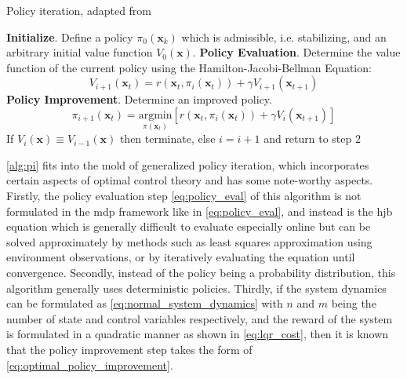 \documentclass[../report.tex]{subfiles}
\begin{document}
\begin{algorithm}[H]
	\caption{Policy iteration, adapted from \cite{pi_and_vi_algorithm}} \label{alg:pi}
	\begin{algorithmic}[1]
        \State \textbf{Initialize}. Define a policy $\pi_0(\mathbf{x}_k)$ which is admissible, i.e. stabilizing, and an arbitrary initial value function $V_0(\mathbf{x})$.
        \State \textbf{Policy Evaluation}. Determine the value function of the current policy using the Hamilton-Jacobi-Bellman Equation:
        \begin{equation}\label{eq:adp_poli_eval}
            V_{i+1}(\mathbf{x}_t) = r(\mathbf{x}_t, \pi_i(\mathbf{x}_t)) + \gamma V_{i+1}(\mathbf{x}_{t+1})
        \end{equation}
        \State \textbf{Policy Improvement}. Determine an improved policy. 
        {\myfont
        \begin{equation}\label{eq:adp_poli_improv}
            \pi_{i+1}(\mathbf{x}_t) = \underset{\pi(\mathbf{x}_t)}{\text{argmin}}[r(\mathbf{x}_t, \pi_i(\mathbf{x}_t)) + \gamma V_i(\mathbf{x}_{t+1})]
        \end{equation}}
        \State If $V_i(\mathbf{x}) \equiv V_{i-1}(\mathbf{x})$ then terminate, else $i = i+1$ and return to step $2$
	\end{algorithmic} 
\end{algorithm}

\autoref{alg:pi} fits into the mold of generalized policy iteration, which incorporates certain aspects of optimal control theory and has some note-worthy aspects. Firstly, the policy evaluation step \autoref{eq:policy_eval} of this algorithm is not formulated in the \ac{mdp} framework like in \autoref{eq:policy_eval}, and instead is the \ac{hjb} equation which is generally difficult to evaluate especially online\cite{frank_lewis_hjb} but can be solved approximately by methods such as least squares approximation using environment observations\cite{ls_approximation}, or by iteratively evaluating the equation until convergence\cite{pi_and_vi_algorithm}. Secondly, instead of the policy being a probability distribution, this algorithm generally uses deterministic policies. Thirdly, if the system dynamics can be formulated as \autoref{eq:normal_system_dynamics} with $n$ and $m$ being the number of state and control variables respectively, and the reward of the system is formulated in a quadratic manner as shown in \autoref{eq:lqr_cost}, then it is known that the policy improvement step takes the form of \autoref{eq:optimal_policy_improvement}\cite{bertsekas2012dynamic}. 
\end{document}
